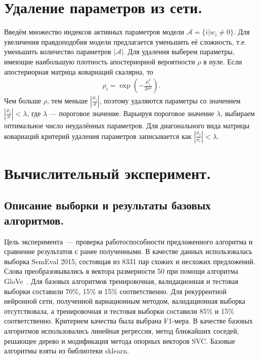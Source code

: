 \documentclass[12pt, fleqn, unicode]{article}
\begin{document}





\newpage
\section{Удаление параметров из сети.}

Введём множество индексов активных параметров модели $\mathcal{A} = \{i | w_i \neq 0\} $. Для увеличения правдоподобия модели предлагается уменьшить её сложность, т.е. уменьшить количество параметров $|\mathcal{A}|$. Для удаления выберем параметры, имеющие наибольшую плотность апостериорной вероятности $\rho$ в нуле.
Если апостериорная матрица ковариаций скалярна, то  
\begin{gather}
	\rho_i = \exp\left(-\frac{\mu_i^2}{2\sigma^2}\right).
\end{gather}
Чем больше $\rho$, тем меньше $|\frac{\mu_i}{\sigma}|$, поэтому удаляются параметры со значением $|\frac{\mu_i}{\sigma}| < \lambda$, где $\lambda$ --- пороговое значение. Варьируя пороговое значение $\lambda$, выбираем оптимальное число неудалённых параметров.
Для диагонального вида матрицы ковариаций критерий удаления параметров записывается как $|\frac{\mu_i}{\sigma_i}| < \lambda$.



\newpage
\section{Вычислительный эксперимент.}
\subsection{Описание выборки и результаты базовых алгоритмов.}
Цель эксперимента~--- проверка работоспособности предложенного алгоритма и сравнение результатов с ранее полученными. В качестве данных использовалась выборка SemEval 2015, состоящая из 8331 пар схожих и несхожих предложений. Слова преобразовывались в вектора размерности 50 при помощи алгоритма GloVe~\cite{GloveURL}.
Для базовых алгоритмов тренировочная, валидационная и тестовая выборки составили 70\%, 15\% и 15\% соответственно.
Для рекуррентной нейронной сети, полученной вариационным методом, валидационная выборка отсутствовала, а тренировочная и тестовая выборки составили 85\% и 15\% соответственно.
Критерием качества была выбрана F1-мера.
В качестве базовых алгоритмов использовались линейная регрессия, метод ближайших соседей, решающее дерево и модификация метода опорных векторов SVC. Базовые алгоритмы взяты из библиотеки sklearn.
\end{document}
